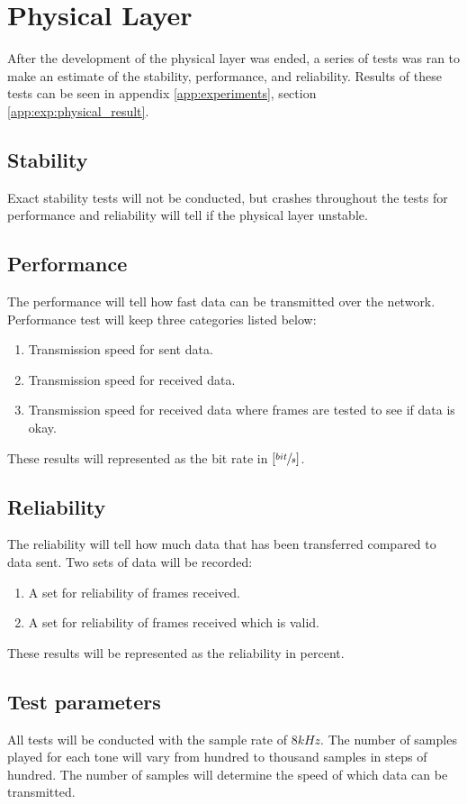 \section{Physical Layer}
After the development of the physical layer was ended, a series of tests was ran to make an estimate of the stability, performance, and reliability. Results of these tests can be seen in appendix \ref{app:experiments}, section \ref{app:exp:physical_result}.

	\subsection{Stability}
	Exact stability tests will not be conducted, but crashes throughout the tests for performance and reliability will tell if the physical layer unstable.

	\subsection{Performance}
	The performance will tell how fast data can be transmitted over the network. Performance test will keep three categories listed below:
	
	\begin{enumerate}
	\item Transmission speed for sent data.
	\item Transmission speed for received data.
	\item Transmission speed for received data where frames are tested to see if data is okay.
	\end{enumerate}
	These results will represented as the bit rate in $[\sfrac{bit}{s}]$.
	
	\subsection{Reliability}
	The reliability will tell how much data that has been transferred compared to data sent. Two sets of data will be recorded:
	
	\begin{enumerate}
	\item A set for reliability of frames received.
	\item A set for reliability of frames received which is valid.
	\end{enumerate}
	These results will be represented as the reliability in percent.
	
	\subsection{Test parameters}
	All tests will be conducted with the sample rate of $8kHz$. The number of samples played for each tone will vary from hundred to thousand samples in steps of hundred. The number of samples will determine the speed of which data can be transmitted.
	
